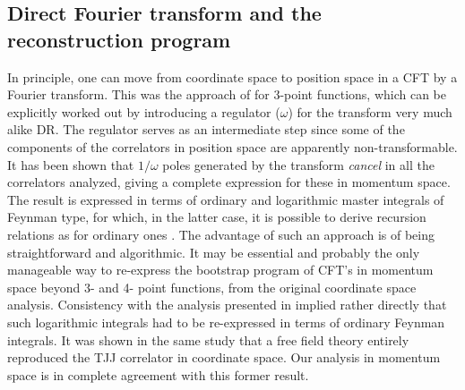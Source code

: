 \documentclass[a4paper,11pt,openright,twoside]{book}
\numberwithin{equation}{section}
\begin{document}
{{\subsection{Direct Fourier transform and the reconstruction program}
In principle, one can move from coordinate space to position space in a CFT by a Fourier transform. This was the approach of \cite{Coriano:2012wp} for 3-point functions, which can be explicitly worked out by introducing a regulator ($\omega$) for the transform very much alike DR. The regulator serves as an intermediate step since some of the components of the correlators in position space are apparently non-transformable. It has been shown that $1/\omega$ poles generated by the transform {\em cancel} in all the correlators analyzed, giving a complete expression for these in momentum space. The result is expressed in terms of ordinary and logarithmic master integrals of Feynman type, for which, in the latter case, it is possible to derive recursion relations as for ordinary ones \cite{Coriano:2012wp}. The advantage of such an approach is of being straightforward and algorithmic. It may be essential and probably the only manageable way to re-express the bootstrap program of CFT's in momentum space beyond 3- and 4- point functions, from the original coordinate space analysis. 
Consistency with the analysis presented in \cite{Coriano:2012wp} implied rather directly that such logarithmic integrals had to be re-expressed in terms of ordinary Feynman integrals. It was shown in the same study that a free field theory entirely reproduced the TJJ correlator in coordinate space. Our analysis in momentum space is in complete agreement with this former result.

}}
\end{document}
